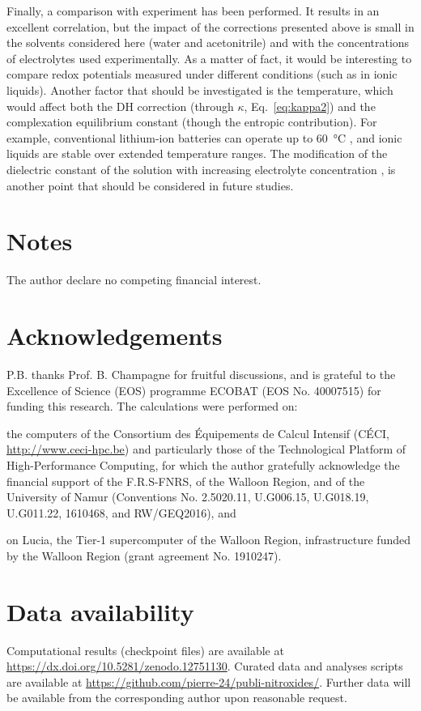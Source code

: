 \documentclass[review,preprint]{elsarticle}
\begin{document}
Finally, a comparison with experiment has been performed. It results in an excellent correlation, but the impact of the corrections presented above is small in the solvents considered here (water and acetonitrile) and with the concentrations of electrolytes used experimentally. As a matter of fact, it would be interesting to compare redox potentials measured under different conditions (such as in ionic liquids). Another factor that should be investigated is the temperature, which would affect both the DH correction (through $\kappa$, Eq.~\eqref{eq:kappa2}) and the complexation equilibrium constant (though the entropic contribution). For example, conventional lithium-ion batteries can operate up to \SI{60}{\degreeCelsius} \cite{maTemperatureEffectThermal2018}, and ionic liquids are stable over extended temperature ranges. The modification of the dielectric constant of the solution with increasing electrolyte concentration \cite{kontogeorgisDebyeHuckelTheoryIts2018, silvaTrueHuckelEquation2022}, is another point that should be considered in future studies.
	
\section*{Notes}
The author declare no competing financial interest.

\section*{Acknowledgements}
P.B. thanks Prof. B. Champagne for fruitful discussions, and is grateful to the Excellence of Science (EOS) programme  ECOBAT (EOS No. 40007515) for funding this research. 
The calculations were performed on: \begin{inparaenum}[(i)]
	\item the computers of the Consortium des \'{E}quipements de Calcul Intensif (C\'{E}CI, \url{http://www.ceci-hpc.be}) and particularly those of the Technological Platform of High-Performance Computing, for which the author gratefully acknowledge the financial support of the F.R.S-FNRS, of the Walloon Region, and of the University of Namur (Conventions No. 2.5020.11, U.G006.15, U.G018.19, U.G011.22, 1610468, and RW/GEQ2016), and
	\item on Lucia, the Tier-1 supercomputer of the Walloon Region, infrastructure funded by the Walloon Region (grant agreement No. 1910247).
\end{inparaenum} 

\section*{Data availability}

Computational results (checkpoint files) are available at \url{https://dx.doi.org/10.5281/zenodo.12751130}.
Curated data and analyses scripts are available at \url{https://github.com/pierre-24/publi-nitroxides/}.
Further data will be available from the corresponding author upon reasonable request.
	

 

	
\end{document}
